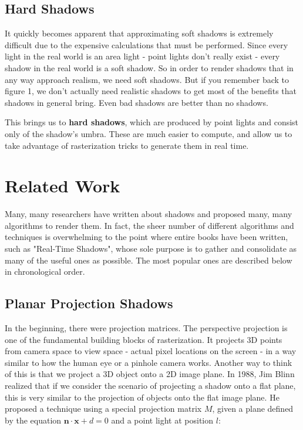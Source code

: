 \documentclass[acmsmall, screen, authorversion, nonacm]{acmart}
\begin{document}
\subsection{Hard Shadows}

It quickly becomes apparent that approximating soft shadows is extremely difficult due to the expensive calculations that must be performed. Since every light in the real world is an area light - point lights don't really exist - every shadow in the real world is a soft shadow. So in order to render shadows that in any way approach realism, we need soft shadows. But if you remember back to figure 1, we don't actually need realistic shadows to get most of the benefits that shadows in general bring. Even bad shadows are better than no shadows.

This brings us to \textbf{hard shadows}, which are produced by point lights and consist only of the shadow's umbra. These are much easier to compute, and allow us to take advantage of rasterization tricks to generate them in real time.

\section{Related Work}

Many, many researchers have written about shadows and proposed many, many algorithms to render them. In fact, the sheer number of different algorithms and techniques is overwhelming to the point where entire books have been written, such as "Real-Time Shadows"\cite{eisemann2011real}, whose sole purpose is to gather and consolidate as many of the useful ones as possible. The most popular ones are described below in chronological order.

\subsection{Planar Projection Shadows}

In the beginning, there were projection matrices. The perspective projection is one of the fundamental building blocks of rasterization. It projects 3D points from camera space to view space - actual pixel locations on the screen - in a way similar to how the human eye or a pinhole camera works. Another way to think of this is that we project a 3D object onto a 2D image plane. In 1988, Jim Blinn realized that if we consider the scenario of projecting a shadow onto a flat plane, this is very similar to the projection of objects onto the flat image plane\cite{blinn88}. He proposed a technique using a special projection matrix \begin{math} M \end{math}, given a plane defined by the equation \begin{math} \textbf{n} \cdot \textbf{x} + d = 0 \end{math} and a point light at position \begin{math} l \end{math}:
\end{document}
